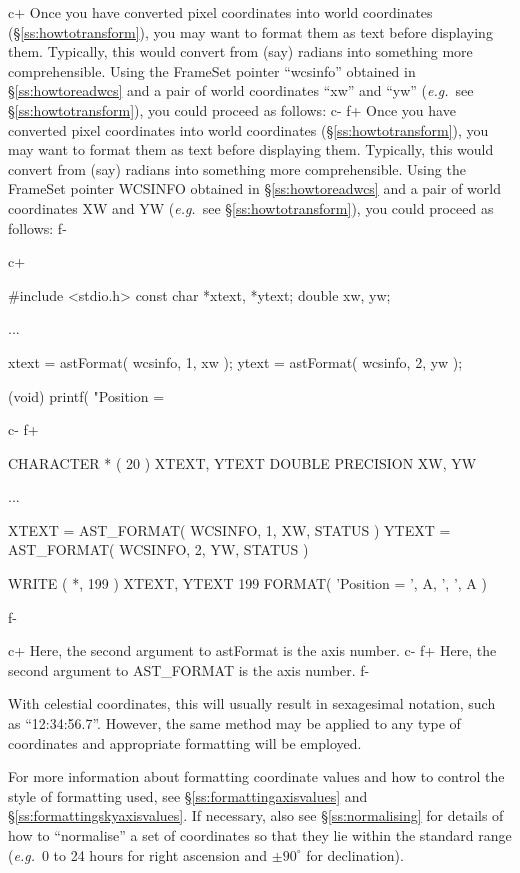 \documentclass[twoside,11pt]{starlink}
\providecommand{\secref}[1]{\S\ref{#1}}
\begin{document}
c+
Once you have converted pixel coordinates into world coordinates
(\secref{ss:howtotransform}), you may want to format them as text
before displaying them. Typically, this would convert from (say)
radians into something more comprehensible. Using the FrameSet pointer
``wcsinfo'' obtained in \secref{ss:howtoreadwcs} and a pair of world
coordinates ``xw'' and ``yw'' (\emph{e.g.}\ see
\secref{ss:howtotransform}), you could proceed as follows:
c-
f+
Once you have converted pixel coordinates into world coordinates
(\secref{ss:howtotransform}), you may want to format them as text
before displaying them. Typically, this would convert from (say)
radians into something more comprehensible. Using the FrameSet pointer
WCSINFO obtained in \secref{ss:howtoreadwcs} and a pair of world
coordinates XW and YW (\emph{e.g.}\ see \secref{ss:howtotransform}),
you could proceed as follows:
f-

c+
\begin{small}
\begin{terminalv}
#include <stdio.h>
const char *xtext, *ytext;
double xw, yw;

...

xtext = astFormat( wcsinfo, 1, xw );
ytext = astFormat( wcsinfo, 2, yw );

(void) printf( "Position = %
\end{terminalv}
\end{small}
c-
f+
\begin{small}
\begin{terminalv}
      CHARACTER * ( 20 ) XTEXT, YTEXT
      DOUBLE PRECISION XW, YW

      ...

      XTEXT = AST_FORMAT( WCSINFO, 1, XW, STATUS )
      YTEXT = AST_FORMAT( WCSINFO, 2, YW, STATUS )

      WRITE ( *, 199 ) XTEXT, YTEXT
 199  FORMAT( 'Position = ', A, ', ', A )
\end{terminalv}
\end{small}
f-

c+
Here, the second argument to astFormat is the axis number.
c-
f+
Here, the second argument to AST\_FORMAT is the axis number.
f-

With celestial coordinates, this will usually result in sexagesimal
notation, such as ``12:34:56.7''. However, the same method may be
applied to any type of coordinates and appropriate formatting will be
employed.

For more information about formatting coordinate values and how to
control the style of formatting used, see
\secref{ss:formattingaxisvalues} and
\secref{ss:formattingskyaxisvalues}. If necessary, also see
\secref{ss:normalising} for details of how to ``normalise'' a set of
coordinates so that they lie within the standard range (\emph{e.g.}\ 0
to 24 hours for right ascension and $\pm 90^\circ$ for
declination).
\end{document}

